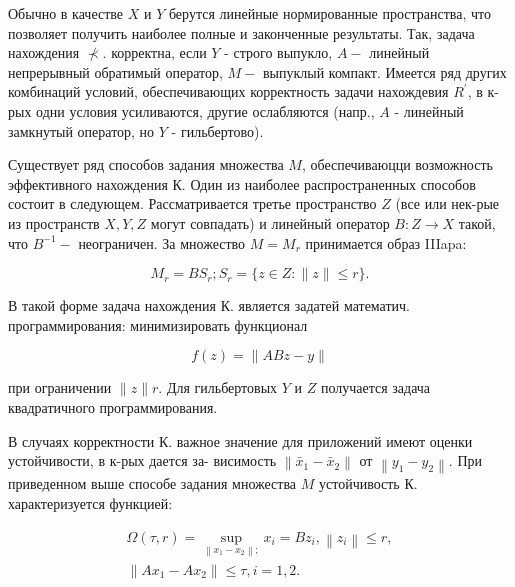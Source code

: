 \documentclass[10pt]{article}
\begin{document}
Обычно в качестве $X$ и $Y$ берутся линейные нормированные пространства, что позволяет получить наиболее полные и законченные результаты. Так, задача нахождения $\nprec$. корректна, если $Y$ - строго выпукло, $A-$ линейный непрерывный обратимый оператор, $M-$ выпуклый компакт. Имеется ряд других комбинаций условий, обеспечивающих корректность задачи нахождевия $R^{\prime}$, в к-рых одни условия усиливаются, другие ослабляются (напр., $A$ - линейный замкнутый оператор, но $Y$ - гильбертово).



Существует ряд способов задания множества $M$, обеспечиваюцци возможность эффективного нахождения $К$. Один из наиболее распространенных способов состоит в следующем. Рассматривается третье пространство $Z$ (все или нек-рые из пространств $X, Y, Z$ могут совпадать) и линейный оператор $B: Z \rightarrow X$ такой, что $B^{-1}-$ неограничен. За множество $M=M_{r}$ принимается образ IIIapa:



\[

M_{r}=B S_{r} ; S_{r}=\{z \in Z:\|z\| \leqslant r\} .

\]



В такой форме задача нахождения К. является задатей математич. программирования: минимизировать функционал



\[

f(z)=\|A B z-y\|

\]



при ограничении $\|z\| r$. Для гильбертовых $Y$ и $Z$ получается задача квадратичного программирования.



В случаях корректности К. важное значение для приложений имеют оценки устойчивости, в к-рых дается за- висимость $\left\|\bar{x}_{1}-\bar{x}_{2}\right\|$ от $\left\|y_{1}-y_{2}\right\|$. При приведенном выше способе задания множества $M$ устойчивость К. характеризуется функцией:



\[

\begin{gathered}

\Omega(\tau, r)=\sup _{\left\|x_{1}-x_{2}\right\| ;} x_{i}=B z_{i},\left\|z_{i}\right\| \leqslant r, \\

\left\|A x_{1}-A x_{2}\right\| \leqslant \tau, i=1,2 .

\end{gathered}

\]
\end{document}
